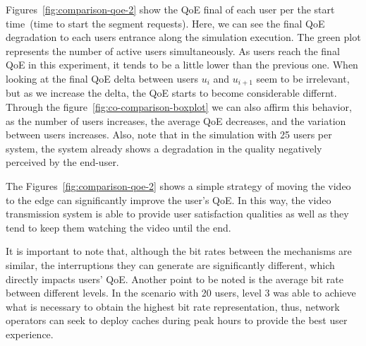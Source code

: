 Figures~\ref{fig:comparison-qoe-2} show the QoE final of each user per the start time~(time to start the segment requests). Here, we can see the final QoE degradation to each users entrance along the simulation execution. The green plot represents the number of active users simultaneously.  
As users reach the final QoE in this experiment, it tends to be a little lower than the previous one. When looking at the final QoE delta between users $u_{i}$ and $u_{i + 1}$ seem to be irrelevant, but as we increase the delta, the QoE starts to become considerable differnt. Through the figure~\ref{fig:co-comparison-boxplot} we can also affirm this behavior, as the number of users increases, the average QoE decreases, and the variation between users increases. Also, note that in the simulation with 25 users per system, the system already shows a degradation in the quality negatively perceived by the end-user.


The Figures~\ref{fig:comparison-qoe-2} shows a simple strategy of moving the video to the edge can significantly improve the user's QoE. In this way, the video transmission system is able to provide user satisfaction qualities as well as they tend to keep them watching the video until the end. 

It is important to note that, although the bit rates between the mechanisms are similar, the interruptions they can generate are significantly different, which directly impacts users' QoE. Another point to be noted is the average bit rate between different levels. In the scenario with 20 users, level 3 was able to achieve what is necessary to obtain the highest bit rate representation, thus, network operators can seek to deploy caches during peak hours to provide the best user experience.

